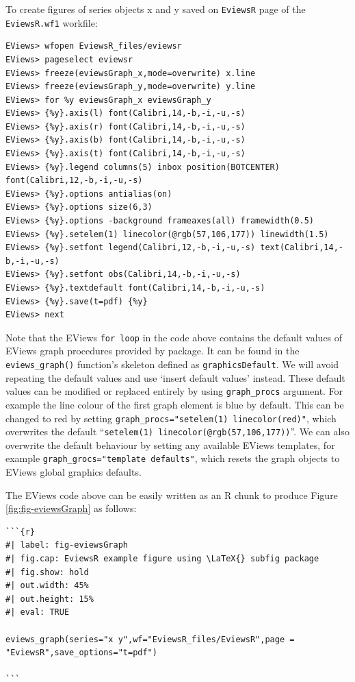 To create figures of series objects x and y saved on \texttt{EviewsR} page of the \texttt{EviewsR.wf1} workfile:

\begin{verbatim}
EViews> wfopen EviewsR_files/eviewsr
EViews> pageselect eviewsr
EViews> freeze(eviewsGraph_x,mode=overwrite) x.line
EViews> freeze(eviewsGraph_y,mode=overwrite) y.line
EViews> for %y eviewsGraph_x eviewsGraph_y
EViews> {%y}.axis(l) font(Calibri,14,-b,-i,-u,-s)
EViews> {%y}.axis(r) font(Calibri,14,-b,-i,-u,-s)
EViews> {%y}.axis(b) font(Calibri,14,-b,-i,-u,-s)
EViews> {%y}.axis(t) font(Calibri,14,-b,-i,-u,-s)
EViews> {%y}.legend columns(5) inbox position(BOTCENTER) font(Calibri,12,-b,-i,-u,-s)
EViews> {%y}.options antialias(on)
EViews> {%y}.options size(6,3)
EViews> {%y}.options -background frameaxes(all) framewidth(0.5)
EViews> {%y}.setelem(1) linecolor(@rgb(57,106,177)) linewidth(1.5)
EViews> {%y}.setfont legend(Calibri,12,-b,-i,-u,-s) text(Calibri,14,-b,-i,-u,-s) 
EViews> {%y}.setfont obs(Calibri,14,-b,-i,-u,-s)
EViews> {%y}.textdefault font(Calibri,14,-b,-i,-u,-s)
EViews> {%y}.save(t=pdf) {%y} 
EViews> next
\end{verbatim}

Note that the EViews \texttt{for\ loop} in the code above contains the default values of EViews graph procedures provided by  package. It can be found in the \texttt{eviews\_graph()} function's skeleton defined as \texttt{graphicsDefault}. We will avoid repeating the default values and use `insert default values' instead. \color{black} These default values can be modified or replaced entirely by using \texttt{graph\_procs} argument. For example the line colour of the first graph element is blue by default. This can be changed to red by setting \texttt{graph\_procs="setelem(1)\ linecolor(red)"}, which overwrites the default ``\texttt{setelem(1)\ linecolor(@rgb(57,106,177))}''. We can also overwrite the default behaviour by setting any available EViews templates, for example \texttt{graph\_grocs="template\ defaults"}, which resets the graph objects to EViews global graphics defaults.

The EViews code above can be easily written as an R chunk to produce Figure \ref{fig:fig-eviewsGraph} as follows:

\begin{verbatim}
```{r}  
#| label: fig-eviewsGraph
#| fig.cap: EviewsR example figure using \LaTeX{} subfig package
#| fig.show: hold
#| out.width: 45%
#| out.height: 15%
#| eval: TRUE

eviews_graph(series="x y",wf="EviewsR_files/EviewsR",page = "EviewsR",save_options="t=pdf")

```
\end{verbatim}

